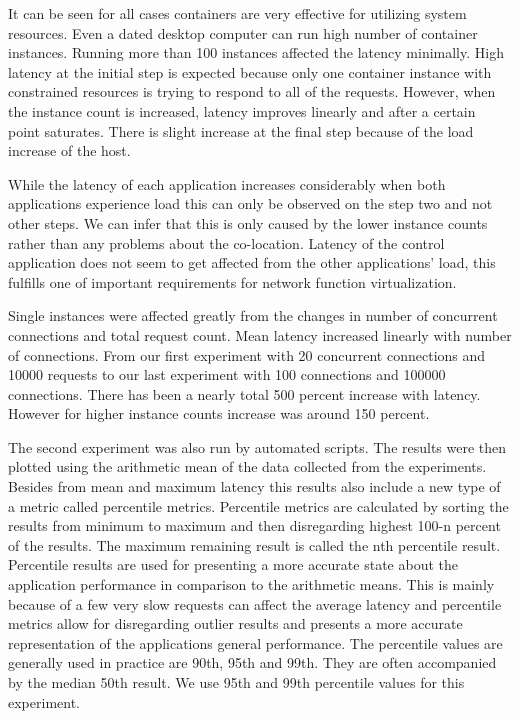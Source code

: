 \documentclass[12pt,oneandhalf,chaparabic,ceng,ms,eng,oneside,pntc]{gsufbe}
\begin{document}
It can be seen for all cases containers are very effective for utilizing system resources. Even a dated desktop
computer can run high number of container instances.  Running more than 100 instances affected the latency minimally.
High latency at the initial step is expected because only one container instance with constrained resources
is trying to respond to all of the requests.
However, when the instance count is increased, latency improves linearly and after a certain point saturates.
There is slight increase at the final step because of the load increase of the host.

While the latency of each application increases considerably when both applications experience load this
can
only be observed on the step two and not other steps.  We can infer that this is only caused by the lower
instance counts rather than any problems about the co-location.  Latency of the control application does not
seem to get affected from the other applications' load, this fulfills one of important requirements for
network function virtualization.

Single instances were affected greatly from the changes in number of concurrent connections and total
request count. Mean latency increased linearly with number of connections. From our first experiment
with 20 concurrent connections and 10000 requests to our last experiment with 100 connections and 
100000 connections. There has been a nearly total 500 percent increase with latency. However for higher
instance counts increase was around 150 percent.

The second experiment was also run by automated scripts.  The results were then plotted using the 
arithmetic mean of the data collected from the experiments. Besides from mean and maximum latency this
results also include a new type of a metric called percentile metrics. Percentile metrics are 
calculated by sorting the results from minimum to maximum and then disregarding highest 100-n
percent of the results. The maximum remaining result is called the nth percentile result. Percentile
results are used for presenting a more accurate state about the application performance in comparison to the
arithmetic means.  This is mainly because of a few very slow requests can affect the average latency
and percentile metrics allow for disregarding outlier results and presents a more accurate
representation of the applications general performance. The percentile values are generally used in
practice
are 90th, 95th and 99th. They are often accompanied by the median 50th result. We use 95th
and 99th percentile values for this experiment.
\end{document}
